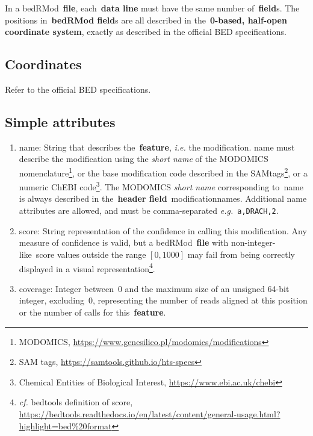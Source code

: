 \documentclass[11pt]{article}
\begin{document}
In a \ac{bedRMod}~\textbf{file}, each~\textbf{data line} must have the same number of~\textbf{field}s.
The positions in~\textbf{\acs{bedRMod} field}s are all described in the~\textbf{0-based, half-open coordinate system}, exactly as 
described in the official \ac{BED} specifications.

\subsection{Coordinates}
Refer to the official \ac{BED} specifications.

\subsection{Simple attributes}
\begin{enumerate}
\item \textsf{name}: String that describes the~\textbf{feature}, \textit{i.e.} the modification. \textsf{name} must describe 
the modification using the \emph{short name} of the MODOMICS nomenclature\footnote{MODOMICS, \url{https://www.genesilico.pl/modomics/modifications}}, or the base modification code described in the SAMtags\footnote{SAM tags, \url{https://samtools.github.io/hts-specs}}, or a numeric ChEBI code\footnote{Chemical Entities of Biological Interest, \url{https://www.ebi.ac.uk/chebi}}. The MODOMICS \emph{short name} corresponding to~\textsf{name} is always described in the~\textbf{header field}~\textsf{modification\textunderscore names}. Additional name attributes are allowed, and must be comma-separated \textit{e.g.}~\texttt{a,DRACH,2}.

\item \textsf{score}: String representation of the confidence in calling this modification. Any measure of confidence is valid, but a \ac{bedRMod}~\textbf{file} with non-integer-like~\textsf{score} values outside the range $[0, 1000]$ may fail from being correctly displayed in a visual representation\footnote{\textit{cf.} bedtools definition of score, \url{https://bedtools.readthedocs.io/en/latest/content/general-usage.html?highlight=bed\%20format}}.

\item \textsf{coverage}: Integer between~0 and the maximum size of an unsigned 64-bit integer, excluding~0, representing the number of reads aligned at this position or the number of calls for this~\textbf{feature}.


\end{enumerate}
\end{document}
